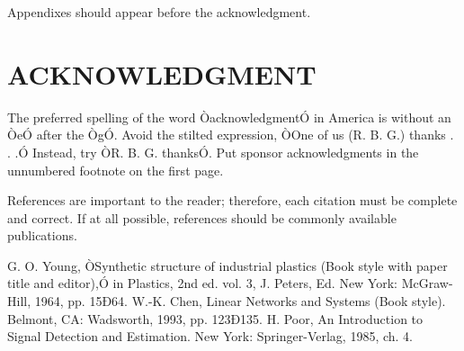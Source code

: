 \documentclass[letterpaper, 10 pt, conference]{ieeeconf}  %
\begin{document}
Appendixes should appear before the acknowledgment.

\section*{ACKNOWLEDGMENT}

The preferred spelling of the word ÒacknowledgmentÓ in America is without an ÒeÓ after the ÒgÓ. Avoid the stilted expression, ÒOne of us (R. B. G.) thanks . . .Ó  Instead, try ÒR. B. G. thanksÓ. Put sponsor acknowledgments in the unnumbered footnote on the first page.




References are important to the reader; therefore, each citation must be complete and correct. If at all possible, references should be commonly available publications.



\begin{thebibliography}{99}

 G. O. Young, ÒSynthetic structure of industrial plastics (Book style with paper title and editor),Ó 	in Plastics, 2nd ed. vol. 3, J. Peters, Ed.  New York: McGraw-Hill, 1964, pp. 15Ð64.
 W.-K. Chen, Linear Networks and Systems (Book style).	Belmont, CA: Wadsworth, 1993, pp. 123Ð135.
 H. Poor, An Introduction to Signal Detection and Estimation.   New York: Springer-Verlag, 1985, ch. 4.


\end{thebibliography}
\end{document}

